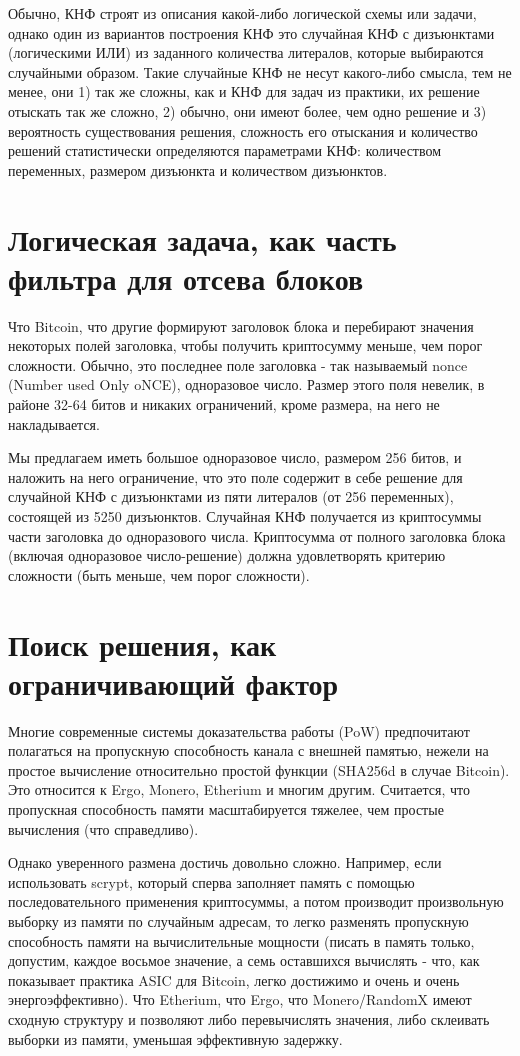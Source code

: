 \documentclass[acmlarge,screen]{acmart}
\begin{document}
Обычно, КНФ строят из описания какой-либо логической схемы или задачи, однако один из вариантов 
построения КНФ это случайная КНФ с дизъюнктами (логическими ИЛИ) из заданного количества литералов, 
которые выбираются случайными образом. Такие случайные КНФ не несут какого-либо смысла, тем не менее, они 1) 
так же сложны, как и КНФ для задач из практики, их решение отыскать так же сложно, 2) обычно, они имеют более, 
чем одно решение и 3) вероятность существования решения, сложность его отыскания и количество решений 
статистически определяются параметрами КНФ: количеством переменных, размером дизъюнкта и количеством дизъюнктов.

\section{Логическая задача, как часть фильтра для отсева блоков}

Что Bitcoin, что другие формируют заголовок блока и перебирают значения некоторых полей заголовка, 
чтобы получить криптосумму меньше, чем порог сложности. Обычно, это последнее поле заголовка - 
так называемый nonce (Number used Only oNCE), одноразовое число. Размер этого поля невелик, 
в районе 32-64 битов и никаких ограничений, кроме размера, на него не накладывается.

Мы предлагаем иметь большое одноразовое число, размером 256 битов, и наложить на него ограничение, 
что это поле содержит в себе решение для случайной КНФ с дизъюнктами из пяти литералов (от 256 переменных), 
состоящей из 5250 дизъюнктов. Случайная КНФ получается из криптосуммы части заголовка до одноразового числа. 
Криптосумма от полного заголовка блока (включая одноразовое число-решение) должна удовлетворять критерию сложности (быть меньше, чем порог сложности).

\section{Поиск решения, как ограничивающий фактор}

Многие современные системы доказательства работы (PoW) предпочитают полагаться на пропускную способность 
канала с внешней памятью, нежели на простое вычисление относительно простой функции (SHA256d в случае Bitcoin). 
Это относится к Ergo, Monero, Etherium и многим другим. Считается, что пропускная способность 
памяти масштабируется тяжелее, чем простые вычисления (что справедливо).

Однако уверенного размена достичь довольно сложно. Например, если использовать scrypt, 
который сперва заполняет память с помощью последовательного применения криптосуммы, 
а потом производит произвольную выборку из памяти по случайным адресам, 
то легко разменять пропускную способность памяти на вычислительные мощности 
(писать в память только, допустим, каждое восьмое значение, а семь оставшихся вычислять - что, 
как показывает практика ASIC для Bitcoin, легко достижимо и очень и очень энергоэффективно). 
Что Etherium, что Ergo, что Monero/RandomX имеют сходную структуру и позволяют либо перевычислять 
значения, либо склеивать выборки из памяти, уменьшая эффективную задержку.
\end{document}
